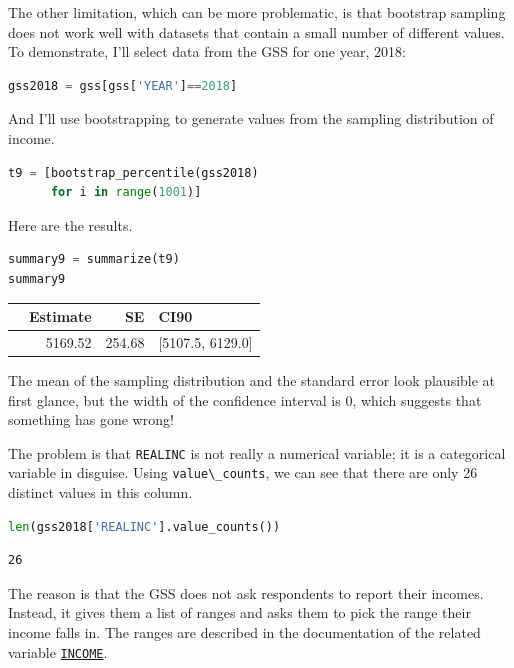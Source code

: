 The other limitation, which can be more problematic, is that bootstrap
sampling does not work well with datasets that contain a small number of
different values. To demonstrate, I'll select data from the GSS for one
year, 2018:

\begin{lstlisting}[language=Python,style=source]
gss2018 = gss[gss['YEAR']==2018]
\end{lstlisting}

And I'll use bootstrapping to generate values from the sampling
distribution of income.

\begin{lstlisting}[language=Python,style=source]
t9 = [bootstrap_percentile(gss2018)
      for i in range(1001)]
\end{lstlisting}

Here are the results.

\begin{lstlisting}[language=Python,style=source]
summary9 = summarize(t9)
summary9
\end{lstlisting}

\begin{tabular}{lrrl}
\toprule
{} &  Estimate &      SE &              CI90 \\
\midrule
{} &   5169.52 &  254.68 &  [5107.5, 6129.0] \\
\bottomrule
\end{tabular}

The mean of the sampling distribution and the standard error look
plausible at first glance, but the width of the confidence interval is
0, which suggests that something has gone wrong!

The problem is that \passthrough{\lstinline!REALINC!} is not really a
numerical variable; it is a categorical variable in disguise. Using
\passthrough{\lstinline!value\_counts!}, we can see that there are only
26 distinct values in this column.

\begin{lstlisting}[language=Python,style=source]
len(gss2018['REALINC'].value_counts())
\end{lstlisting}

\begin{lstlisting}[style=output]
26
\end{lstlisting}

The reason is that the GSS does not ask respondents to report their
incomes. Instead, it gives them a list of ranges and asks them to pick
the range their income falls in. The ranges are described in the
documentation of the related variable
\href{https://gssdataexplorer.norc.org/variables/104/vshow}{\passthrough{\lstinline!INCOME!}}.

